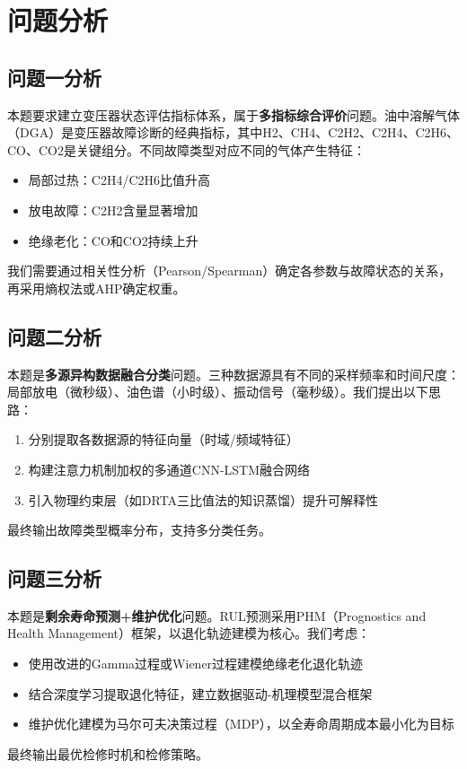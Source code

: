 \newpage
\section{问题分析}

\subsection{问题一分析}
本题要求建立变压器状态评估指标体系，属于\textbf{多指标综合评价}问题。油中溶解气体（DGA）是变压器故障诊断的经典指标，其中H2、CH4、C2H2、C2H4、C2H6、CO、CO2是关键组分。不同故障类型对应不同的气体产生特征：
\begin{itemize}
    \item 局部过热：C2H4/C2H6比值升高
    \item 放电故障：C2H2含量显著增加
    \item 绝缘老化：CO和CO2持续上升
\end{itemize}
我们需要通过相关性分析（Pearson/Spearman）确定各参数与故障状态的关系，再采用熵权法或AHP确定权重。

\subsection{问题二分析}
本题是\textbf{多源异构数据融合分类}问题。三种数据源具有不同的采样频率和时间尺度：局部放电（微秒级）、油色谱（小时级）、振动信号（毫秒级）。我们提出以下思路：
\begin{enumerate}
    \item 分别提取各数据源的特征向量（时域/频域特征）
    \item 构建注意力机制加权的多通道CNN-LSTM融合网络
    \item 引入物理约束层（如DRTA三比值法的知识蒸馏）提升可解释性
\end{enumerate}
最终输出故障类型概率分布，支持多分类任务。

\subsection{问题三分析}
本题是\textbf{剩余寿命预测+维护优化}问题。RUL预测采用PHM（Prognostics and Health Management）框架，以退化轨迹建模为核心。我们考虑：
\begin{itemize}
    \item 使用改进的Gamma过程或Wiener过程建模绝缘老化退化轨迹
    \item 结合深度学习提取退化特征，建立数据驱动-机理模型混合框架
    \item 维护优化建模为马尔可夫决策过程（MDP），以全寿命周期成本最小化为目标
\end{itemize}
最终输出最优检修时机和检修策略。
